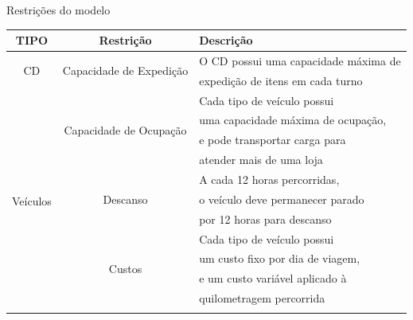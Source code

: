                     
        \begin{quadro}[H]
            \caption{Restrições do modelo}
            \centering
            \begin{tabular}{|c|c|l|}
                \hline
                TIPO                        & Restrição                                     & Descrição                             \\ \hline
                \multirow{2}{*}{CD}         & \multirow{2}{*}{Capacidade de Expedição}      & O CD possui uma capacidade máxima de  \\
                                            &                                               & expedição de itens em cada turno      \\ 
                \hline
                \multirow{17}{*}{Veículos}  & \multirow{4}{*}{Capacidade de Ocupação}       & Cada tipo de veículo possui           \\
                                            &                                               & uma capacidade máxima de ocupação,    \\
                                            &                                               & e pode transportar carga para         \\
                                            &                                               & atender mais de uma loja              \\   \cline{2-3}
                                            & \multirow{3}{*}{Descanso}                     & A cada 12 horas percorridas,          \\
                                            &                                               & o veículo deve permanecer parado      \\
                                            &                                               & por 12 horas para descanso            \\   \cline{2-3}
                                            & \multirow{4}{*}{Custos}                       & Cada tipo de veículo possui           \\
                                            &                                               & um custo fixo por dia de viagem,      \\
                                            &                                               & e um custo variável aplicado à        \\
                                            &                                               & quilometragem percorrida              \\   \cline{2-3}

\end{tabular}
\end{quadro}
